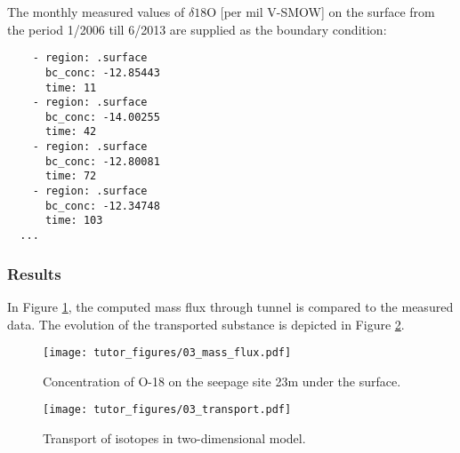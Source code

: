 The monthly measured values of \(\delta18\text{O}\) {[}per mil V-SMOW{]}
on the surface from the period 1/2006 till 6/2013 are supplied as the
boundary condition:

\begin{verbatim}
    - region: .surface
      bc_conc: -12.85443
      time: 11
    - region: .surface
      bc_conc: -14.00255
      time: 42
    - region: .surface
      bc_conc: -12.80081
      time: 72
    - region: .surface
      bc_conc: -12.34748
      time: 103
  ...
\end{verbatim}

\subsubsection{Results}\label{results}

In Figure \ref{fig:conc_graph}, the computed mass flux through tunnel is
compared to the measured data. The evolution of the transported
substance is depicted in Figure \ref{fig:mass_real}.

\begin{figure}[htbp]
\centering
\texttt{[image: tutor\_figures/03\_mass\_flux.pdf]}
\caption{Concentration of O-18 on the seepage site 23m under the
surface.\label{fig:conc_graph}}
\end{figure}

\begin{figure}[htbp]
\centering
\texttt{[image: tutor\_figures/03\_transport.pdf]}
\caption{Transport of isotopes in two-dimensional
model.\label{fig:mass_real}}
\end{figure}
